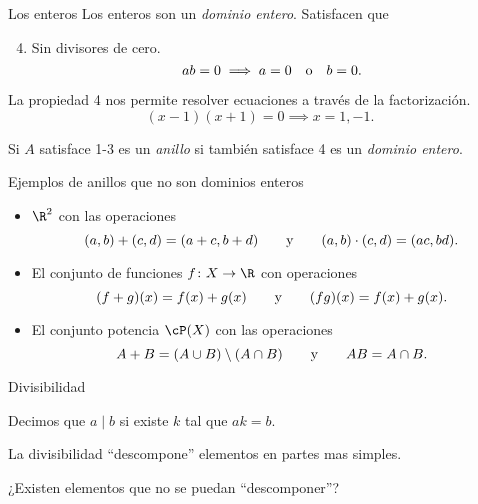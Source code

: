 \begin{frame}{Los enteros}
  Los enteros son un \emph{dominio entero}. Satisfacen que
  \begin{enumerate}\setcounter{enumi}{3}
    \item Sin divisores de cero.
      \[
        ab = 0 \implies a = 0 \quad\text{o}\quad b = 0.
      \]
  \end{enumerate}

  \pause
  La propiedad 4 nos permite resolver ecuaciones a través de la factorización.
  \[
    (x-1)(x+1) = 0 \implies x = 1, -1.
  \]

  \pause
  \begin{definition}
    Si $A$ satisface 1-3 es un \emph{anillo} si también satisface 4 es un \emph{dominio entero}.
  \end{definition}
\end{frame}




\begin{frame}{Ejemplos de anillos que no son dominios enteros}
  \begin{itemize}[<+->]
    \item $\R^2$ con las operaciones
      \[
        (a,b) + (c,d) = (a+c,b+d)     \qquad\text{y}\qquad
        (a,b) \cdot (c,d) = (ac,bd).
      \]

    \item El conjunto de funciones $f\colon X \to \R$ con operaciones
    \[
        (f+g)(x) = f(x) + g(x)     \qquad\text{y}\qquad
        (fg)(x) = f(x) + g(x) .
    \]

    \item El conjunto potencia $\cP(X)$ con las operaciones
    \[
      A+B = (A \cup B) \setminus (A \cap B)     \qquad\text{y}\qquad
      AB = A \cap B.
    \]
  \end{itemize}
\end{frame}



\begin{frame}{Divisibilidad}
  \begin{definition}
    Decimos que $a \mid b$ si existe $k$ tal que $ak = b$.
  \end{definition}

  \pause\bigskip
  La divisibilidad ``descompone'' elementos en partes mas simples.

  \pause\bigskip
  ¿Existen elementos que no se puedan ``descomponer''?
\end{frame}


